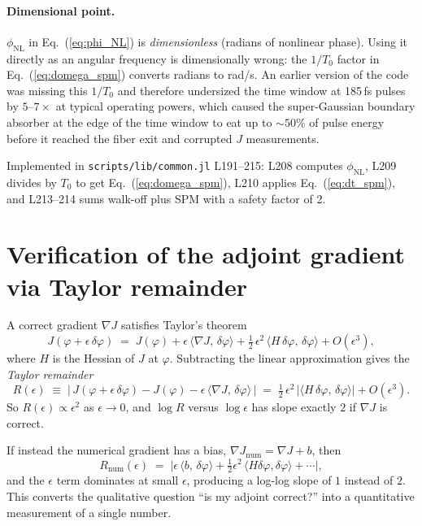 \documentclass[11pt]{article}
\begin{document}
\paragraph{Dimensional point.} $\phi_\text{NL}$ in Eq.~(\ref{eq:phi_NL}) is
\emph{dimensionless} (radians of nonlinear phase). Using it directly as an
angular frequency is dimensionally wrong: the $1/T_0$ factor in
Eq.~(\ref{eq:domega_spm}) converts radians to rad/s. An earlier version of the
code was missing this $1/T_0$ and therefore undersized the time window at
185\,fs pulses by $5$--$7\times$ at typical operating powers, which caused the
super-Gaussian boundary absorber at the edge of the time window to eat up to
$\sim 50\%$ of pulse energy before it reached the fiber exit and corrupted $J$
measurements.

Implemented in \texttt{scripts/lib/common.jl} L191--215: L208 computes
$\phi_\text{NL}$, L209 divides by $T_0$ to get Eq.~(\ref{eq:domega_spm}), L210
applies Eq.~(\ref{eq:dt_spm}), and L213--214 sums walk-off plus SPM with a
safety factor of 2.

\section{Verification of the adjoint gradient via Taylor remainder}

A correct gradient $\nabla J$ satisfies Taylor's theorem
\begin{equation}
  J(\varphi + \epsilon\,\delta\varphi)
  \;=\; J(\varphi) + \epsilon\,\langle \nabla J,\,\delta\varphi\rangle
        + \tfrac{1}{2}\,\epsilon^2\,\langle H\,\delta\varphi,\,\delta\varphi\rangle
        + O(\epsilon^3),
  \label{eq:taylor_expansion}
\end{equation}
where $H$ is the Hessian of $J$ at $\varphi$. Subtracting the linear
approximation gives the \emph{Taylor remainder}
\begin{equation}
  R(\epsilon) \;\equiv\;
  \bigl|\,J(\varphi + \epsilon\,\delta\varphi) - J(\varphi)
        - \epsilon\,\langle \nabla J,\,\delta\varphi\rangle\,\bigr|
  \;=\; \tfrac{1}{2}\,\epsilon^2\,|\langle H\,\delta\varphi,\,\delta\varphi\rangle|
        + O(\epsilon^3).
  \label{eq:taylor_remainder}
\end{equation}
So $R(\epsilon) \propto \epsilon^2$ as $\epsilon \to 0$, and
$\log R$ versus $\log \epsilon$ has slope exactly $2$ if $\nabla J$ is correct.

If instead the numerical gradient has a bias,
$\nabla J_\text{num} = \nabla J + b$, then
\begin{equation}
  R_\text{num}(\epsilon)
  \;=\; \bigl|\epsilon\,\langle b,\,\delta\varphi\rangle
        + \tfrac{1}{2}\epsilon^2\,\langle H\delta\varphi,\delta\varphi\rangle
        + \cdots\bigr|,
  \label{eq:taylor_biased}
\end{equation}
and the $\epsilon$ term dominates at small $\epsilon$, producing a log-log
slope of $1$ instead of $2$. This converts the qualitative question ``is my
adjoint correct?'' into a quantitative measurement of a single number.
\end{document}
